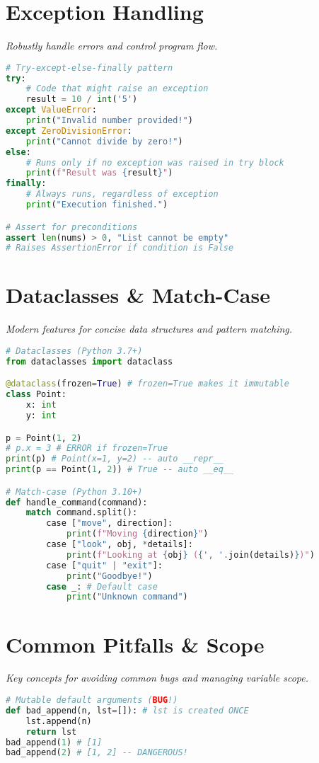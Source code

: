 \documentclass[8pt,landscape]{article}
\begin{document}
\begin{multicols}{3}
\section*{Exception Handling}
\textit{Robustly handle errors and control program flow.}
\begin{lstlisting}[language=Python]
# Try-except-else-finally pattern
try:
    # Code that might raise an exception
    result = 10 / int('5')
except ValueError:
    print("Invalid number provided!")
except ZeroDivisionError:
    print("Cannot divide by zero!")
else:
    # Runs only if no exception was raised in try block
    print(f"Result was {result}")
finally:
    # Always runs, regardless of exception
    print("Execution finished.")

# Assert for preconditions
assert len(nums) > 0, "List cannot be empty"
# Raises AssertionError if condition is False
\end{lstlisting}

\section*{Dataclasses \& Match-Case}
\textit{Modern features for concise data structures and pattern matching.}
\begin{lstlisting}[language=Python]
# Dataclasses (Python 3.7+)
from dataclasses import dataclass

@dataclass(frozen=True) # frozen=True makes it immutable
class Point:
    x: int
    y: int

p = Point(1, 2)
# p.x = 3 # ERROR if frozen=True
print(p) # Point(x=1, y=2) -- auto __repr__
print(p == Point(1, 2)) # True -- auto __eq__

# Match-case (Python 3.10+)
def handle_command(command):
    match command.split():
        case ["move", direction]:
            print(f"Moving {direction}")
        case ["look", obj, *details]:
            print(f"Looking at {obj} ({', '.join(details)})")
        case ["quit" | "exit"]:
            print("Goodbye!")
        case _: # Default case
            print("Unknown command")
\end{lstlisting}

\section*{Common Pitfalls \& Scope}
\textit{Key concepts for avoiding common bugs and managing variable scope.}
\begin{lstlisting}[language=Python]
# Mutable default arguments (BUG!)
def bad_append(n, lst=[]): # lst is created ONCE
    lst.append(n)
    return lst
bad_append(1) # [1]
bad_append(2) # [1, 2] -- DANGEROUS!


\end{lstlisting}
\end{multicols}
\end{document}
